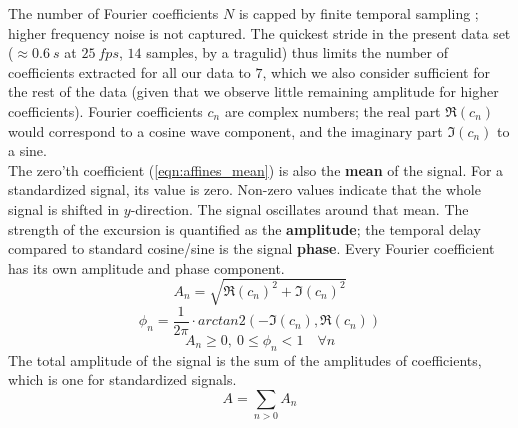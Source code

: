 The number of Fourier coefficients $N$ is capped by finite temporal sampling \cite[Nyquist–Shannon sampling theorem,][]{Nyquist1928,Shannon1949}; higher frequency noise is not captured.
The quickest stride in the present data set ($\approx 0.6\ s$ at $25\ fps$, $14$ samples, by a tragulid) thus limits the number of coefficients extracted for all our data to $7$, which we also consider sufficient for the rest of the data (given that we observe little remaining amplitude for higher coefficients).
Fourier coefficients $c_{n}$ are complex numbers; the real part $\Re(c_{n})$ would correspond to a cosine wave component, and the imaginary part $\Im(c_{n})$ to a sine.
\bigskip\\The zero'th coefficient (\eqref{eqn:affines_mean}) is also the \textbf{mean} of the signal.
For a standardized signal, its value is zero.
Non-zero values indicate that the whole signal is shifted in $y$-direction.
The signal oscillates around that mean.
The strength of the excursion is quantified as the \textbf{amplitude}; the temporal delay compared to standard cosine/sine is the signal \textbf{phase}.
Every Fourier coefficient has its own amplitude and phase component.
$$A_{n} = \sqrt{\Re(c_{n})^{2}+\Im(c_{n})^{2}}$$
$$\phi_{n} = \frac{1}{2\pi}\cdot arctan2\left( -\Im(c_{n}),\Re(c_{n})\right)$$
$$A_{n} \ge 0,\ 0 \le \phi_{n} < 1 \quad \forall n$$
The total amplitude of the signal is the sum of the amplitudes of coefficients, which is one for standardized signals.
	\begin{equation}\label{eqn:affines_amplitude}
	A = \sum\limits_{n > 0} A_{n}
	\end{equation}


